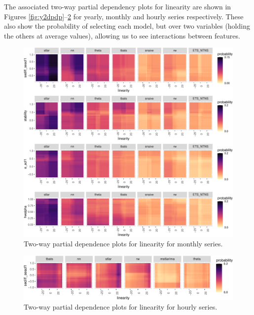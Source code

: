\documentclass[11pt,a4paper,]{article}
\begin{document}
The associated two-way partial dependency plots for linearity are shown in Figures \ref{fig:y2dpdp}--\ref{fig:h2dpdp} for yearly, monthly and hourly series respectively. These also show the probability of selecting each model, but over two variables (holding the others at average values), allowing us to see interactions between features.

\begin{figure}[!tbp]

{\centering \includegraphics[width=0.95\linewidth]{figure/m2dpdp-1} 

}

\caption{Two-way partial dependence plots for linearity for monthly series.}\label{fig:m2dpdp}
\end{figure}

\begin{figure}[!tbp]

{\centering \includegraphics[width=0.95\linewidth]{figure/h2dpdp-1} 

}

\caption{Two-way partial dependence plots for linearity for hourly series.}\label{fig:h2dpdp}
\end{figure}
\end{document}

